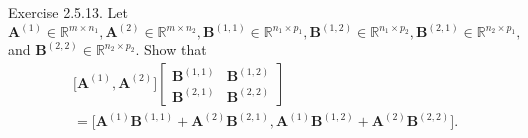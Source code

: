 \documentclass{article}
\theoremstyle{plain}
\begin{document}
\begin{itembox}[l]{Exercise 2.5.13.}
	Let
	\begin{math}
		\bm{A}^{(1)} \in \mathbb{R}^{m \times n_1} , \bm{A}^{(2)} \in \mathbb{R}^{m \times n_2} ,
		\bm{B}^{(1,1)} \in \mathbb{R}^{n_1 \times p_1} , \bm{B}^{(1,2)} \in \mathbb{R}^{n_1 \times p_2} ,
        \bm{B}^{(2,1)} \in \mathbb{R}^{n_2 \times p_1} ,
	\end{math}
	and
	\begin{math}
		\bm{B}^{(2,2)} \in \mathbb{R}^{n_2 \times p_2} .
	\end{math}
	Show that
	\begin{equation}
		\begin{split}
			&\lbrack \bm{A}^{(1)} , \bm{A}^{(2)} \rbrack
		    \begin{bmatrix}
			    \bm{B}^{(1,1)} & \bm{B}^{(1,2)} \\
			    \bm{B}^{(2,1)} & \bm{B}^{(2,2)}
		    \end{bmatrix} \\
			&=
		    \lbrack \bm{A}^{(1)} \bm{B}^{(1,1)} + \bm{A}^{(2)} \bm{B}^{(2,1)} , \bm{A}^{(1)} \bm{B}^{(1,2)} + \bm{A}^{(2)} \bm{B}^{(2,2)} \rbrack .
		\end{split}
	\end{equation}
\end{itembox}
\end{document}
